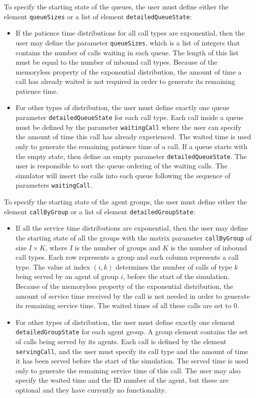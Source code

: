 To specify the starting state of the queues, the user must
define either the element \texttt{queueSizes} or a list of element \texttt{detailed\-Queue\-State}:
\begin{itemize}
\item If the patience time distributions for all call types
are exponential, then the user may define the parameter \texttt{queueSizes}, which
is a list of integers that contains the number
of calls waiting in each queue. The length of this list must be
equal to the number of inbound call types.
Because of the memoryless property of the exponential distribution,
the amount of time a call has already waited is not required 
in order to generate its remaining patience time.
\item For other types of distribution, the user must define
exactly one queue parameter \texttt{detailed\-Queue\-State} for each call type.
Each call inside a queue must be defined by the parameter \texttt{waitingCall}
where the user can specify the amount of time this call has already experienced.
The waited time is used only to generate the remaining patience time of a call.
If a queue starts with the empty state, then define an empty parameter \texttt{detailed\-Queue\-State}.
The user is responsible to sort the queue ordering of the waiting calls.
The simulator will insert the calls into each queue
following the sequence of parameters \texttt{waitingCall}.
\end{itemize}

To specify the starting state of the agent groups, the user
must define either the element \texttt{callByGroup} or a list of
element \texttt{detailed\-Group\-State}:
\begin{itemize}
\item If all the service time distributions are exponential, then the user may define
the starting state of all the groups with the matrix parameter \texttt{callByGroup}
of size $I \times K$, where $I$ is the number of groups and $K$ is the number
of inbound call types.
Each row represents a group and each column represents a call type.
The value at index $(i,k)$ determines the number of calls of type $k$
being served by an agent of group $i$, before the start of the simulation.
Because of the memoryless property of the exponential distribution, the
amount of service time received by the call is not needed in order to
generate its remaining service time.
The waited times of all these calls are set to 0.
\item For other types of distribution, the user must define
exactly one element \texttt{detailed\-Group\-State} for each agent group.
A group element contains the set of calls
being served by its agents.
Each call is defined by the element \texttt{servingCall}, and
the user must specify its call type and the
amount of time it has been served before the start of the simulation.
The served time is used only to generate the remaining service time of this call.
The user may also specify the waited time and the ID number of the agent, but
these are optional and they have currently no functionality.
\end{itemize}


